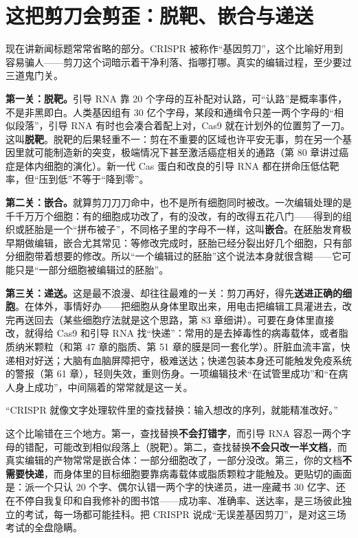 \section{这把剪刀会剪歪：脱靶、嵌合与递送}

现在讲新闻标题常常省略的部分。CRISPR 被称作“基因剪刀”，这个比喻好用到容易骗人——剪刀这个词暗示着干净利落、指哪打哪。真实的编辑过程，至少要过三道鬼门关。

\textbf{第一关：脱靶。}引导 RNA 靠 20 个字母的互补配对认路，可“认路”是概率事件，不是非黑即白。人类基因组有 30 亿个字母，某段和通缉令只差一两个字母的“相似段落”，引导 RNA 有时也会凑合着配上对，Cas9 就在计划外的位置剪了一刀。这叫\textbf{脱靶}。脱靶的后果轻重不一：剪在不重要的区域也许平安无事，剪在另一个基因里就可能制造新的突变，极端情况下甚至激活癌症相关的通路（第 80 章讲过癌症是体内细胞的演化）。新一代 Cas 蛋白和改良的引导 RNA 都在拼命压低估靶率，但“压到低”不等于“降到零”。

\textbf{第二关：嵌合。}就算剪刀刀刀命中，也不是所有细胞同时被改。一次编辑处理的是千千万万个细胞：有的细胞成功改了，有的没改，有的改得五花八门——得到的组织或胚胎是一个“拼布被子”，不同格子里的字母不一样，这叫\textbf{嵌合}。在胚胎发育极早期做编辑，嵌合尤其常见：等修改完成时，胚胎已经分裂出好几个细胞，只有部分细胞带着想要的修改。所以“一个编辑过的胚胎”这个说法本身就很含糊——它可能只是“一部分细胞被编辑过的胚胎”。

\textbf{第三关：递送。}这是最不浪漫、却往往最难的一关：剪刀再好，得先\textbf{送进正确的细胞}。在体外，事情好办——把细胞从身体里取出来，用电击把编辑工具灌进去，改完再送回去（某些细胞疗法就是这个思路，第 83 章细讲）。可要在身体里直接改，就得给 Cas9 和引导 RNA 找“快递”：常用的是去掉毒性的病毒载体，或者脂质纳米颗粒（和第 47 章的脂质、第 51 章的膜是同一套化学）。肝脏血流丰富，快递相对好送；大脑有血脑屏障把守，极难送达；快递包装本身还可能触发免疫系统的警报（第 61 章），轻则失效，重则伤身。一项编辑技术“在试管里成功”和“在病人身上成功”，中间隔着的常常就是这一关。

\begin{wuqu}
“CRISPR 就像文字处理软件里的查找替换：输入想改的序列，就能精准改好。”

这个比喻错在三个地方。第一，查找替换\textbf{不会打错字}，而引导 RNA 容忍一两个字母的错配，可能改到相似段落上（脱靶）。第二，查找替换\textbf{不会只改一半文档}，而真实编辑的产物常常是嵌合体：一部分细胞改了，一部分没改。第三，你的文档\textbf{不需要快递}，而身体里的目标细胞要靠病毒载体或脂质颗粒才能触及。更贴切的画面是：派一个只认 20 个字、偶尔认错一两个字的快递员，进一座藏书 30 亿字、还在不停自我复印和自我修补的图书馆——成功率、准确率、送达率，是三场彼此独立的考试，每一场都可能挂科。把 CRISPR 说成“无误差基因剪刀”，是对这三场考试的全盘隐瞒。
\end{wuqu}

